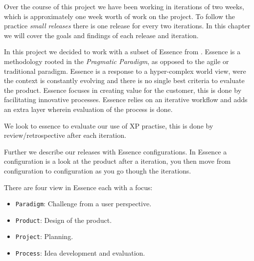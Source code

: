 Over the course of this project we have been working in iterations of two weeks, which is approximately one week worth of work on the project. To follow the practice \textit{small releases} there is one release for every two iterations. In this chapter we will cover the goals and findings of each release and iteration.

In this project we decided to work with a subset of Essence from \citet{essence:config}. Essence is a methodology rooted in the \textit{Pragmatic Paradigm}, as opposed to the agile or traditional paradigm. Essence is a response to a hyper-complex world view, were the context is constantly evolving and there is no single best criteria to evaluate the product. Essence focuses in creating value for the customer, this is done by facilitating innovative processes. Essence relies on an iterative workflow and adds an extra layer wherein evaluation of the process is done. 

We look to essence to evaluate our use of XP practise, this is done by review/retrospective after each iteration.

Further we describe our releases with Essence configurations. In Essence a configuration is a look at the product after a iteration, you then move from configuration to configuration as you go though the iterations. 

There are four view in Essence each with a  focus: 
\begin{itemize}
\item \texttt{Paradigm}: Challenge from a user perspective.
\item \texttt{Product}: Design of the product.
\item \texttt{Project}: Planning.
\item \texttt{Process}: Idea development and evaluation.
\end{itemize}



